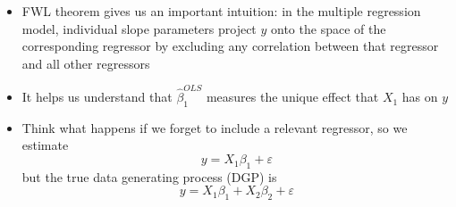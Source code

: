 \documentclass[notes=show]{beamer}
\begin{document}
\begin{frame}%


\begin{itemize}
\item FWL theorem gives us an important intuition: in the multiple
regression model, individual slope parameters project $y$ onto the space of
the corresponding regressor by excluding any correlation between that
regressor and all other regressors

\item It helps us understand that $\widehat{\beta }_{1}^{OLS}$ measures the
unique effect that $X_{1}$ has on $y$

\item Think what happens if we forget to include a relevant regressor, so we
estimate 
\begin{equation*}
y=X_{1}\beta _{1}+\varepsilon
\end{equation*}%
but the true data generating process (DGP) is 
\begin{equation*}
y=X_{1}\beta _{1}+X_{2}\beta _{2}+\varepsilon
\end{equation*}
\end{itemize}

\end{frame}%
\end{document}

